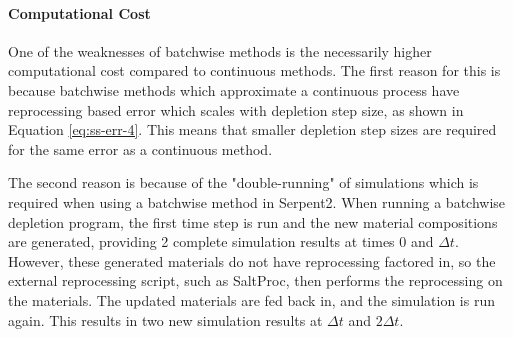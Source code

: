 




\paragraph{Computational Cost}

One of the weaknesses of batchwise methods is the necessarily higher computational cost compared to continuous methods. The first reason for this is because batchwise methods which approximate a continuous process have reprocessing based error which scales with depletion step size, as shown in Equation \eqref{eq:ss-err-4}. This means that smaller depletion step sizes are required for the same error as a continuous method.

The second reason is because of the "double-running" of simulations which is required when using a batchwise method in Serpent2. When running a batchwise depletion program, the first time step is run and the new material compositions are generated, providing 2 complete simulation results at times 0 and $\Delta t$. However, these generated materials do not have reprocessing factored in, so the external reprocessing script, such as SaltProc, then performs the reprocessing on the materials. The updated materials are fed back in, and the simulation is run again. This results in two new simulation results at $\Delta t$ and $2 \Delta t$.

